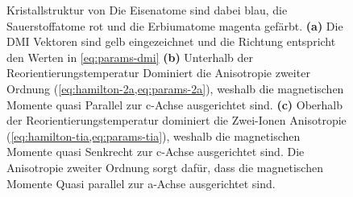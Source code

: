 \documentclass[main.tex]{subfiles}
\begin{document}


\begin{figure}[htbp]
	\centering
	\caption{Kristallstruktur von   Die Eisenatome sind dabei blau, die Sauerstoffatome rot und die Erbiumatome magenta gefärbt. 
	\textbf{(a)} Die DMI Vektoren sind gelb eingezeichnet und die Richtung entspricht den Werten in \cref{eq:params-dmi} 
	\textbf{(b)} Unterhalb der Reorientierungstemperatur Dominiert die Anisotropie zweiter Ordnung (\cref{eq:hamilton-2a,eq:params-2a}), weshalb die magnetischen Momente quasi Parallel zur c-Achse ausgerichtet sind. 
	\textbf{(c)} Oberhalb der Reorientierungstemperatur dominiert die Zwei-Ionen Anisotropie (\cref{eq:hamilton-tia,eq:params-tia}), weshalb die magnetischen Momente quasi Senkrecht zur c-Achse ausgerichtet sind. Die Anisotropie zweiter Ordnung sorgt dafür, dass die magnetischen Momente Quasi parallel zur a-Achse ausgerichtet sind.~\cite{schlegel-master}}
	\label{fig:orthoferrit}
\end{figure}
\end{document}
